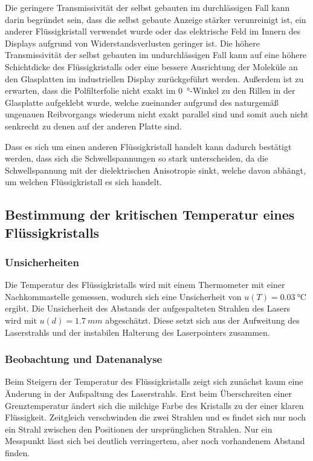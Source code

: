 \documentclass[
	a4paper,
	12pt,
	pagesize,
	ngerman
]{scrartcl}
\begin{document}
	Die geringere Transmissivität der selbst gebauten im durchlässigen Fall kann darin begründet sein, dass die selbst gebaute Anzeige stärker verunreinigt ist, ein anderer Flüssigkristall verwendet wurde oder das elektrische Feld im Innern des Displays aufgrund von Widerstandsverlusten geringer ist.
	Die höhere Transmissivität der selbst gebauten im undurchlässigen Fall kann auf eine höhere Schichtdicke des Flüssigkristalls oder eine bessere Ausrichtung der Moleküle an den Glasplatten im industriellen Display zurückgeführt werden.
	Außerdem ist zu erwarten, dass die Polfilterfolie nicht exakt im \SI{0}{\degree}-Winkel zu den Rillen in der Glasplatte aufgeklebt wurde, welche zueinander aufgrund des naturgemäß ungenauen Reibvorgangs wiederum nicht exakt parallel sind und somit auch nicht senkrecht zu denen auf der anderen Platte sind.

	Dass es sich um einen anderen Flüssigkristall handelt kann dadurch bestätigt werden, dass sich die Schwellspannungen so stark unterscheiden, da die Schwellspannung mit der dielektrischen Anisotropie sinkt, welche davon abhängt, um welchen Flüssigkristall es sich handelt.

	\subsection{Bestimmung der kritischen Temperatur eines Flüssigkristalls}
	\subsubsection{Unsicherheiten}
	Die Temperatur des Flüssigkristalls wird mit einem Thermometer mit einer Nachkommastelle gemessen, wodurch sich eine Unsicherheit von $u(T)=\SI{0.03}{\celsius}$ ergibt.
	Die Unsicherheit des Abstands der aufgespalteten Strahlen des Lasers wird mit $u(d)=\SI{1.7}{mm}$ abgeschätzt.
	Diese setzt sich aus der Aufweitung des Laserstrahls und der instabilen Halterung des Laserpointers zusammen.
	\subsubsection{Beobachtung und Datenanalyse}
	Beim Steigern der Temperatur des Flüssigkristalls zeigt sich zunächst kaum eine Änderung in der Aufspaltung des Laserstrahls.
	Erst beim Überschreiten einer Grenztemperatur ändert sich die milchige Farbe des Kristalls zu der einer klaren Flüssigkeit.
	Zeitgleich verschwinden die zwei Strahlen und es findet sich nur noch ein Strahl zwischen den Positionen der ursprünglichen Strahlen.
	Nur ein Messpunkt lässt sich bei deutlich verringertem, aber noch vorhandenem Abstand finden.
\end{document}
